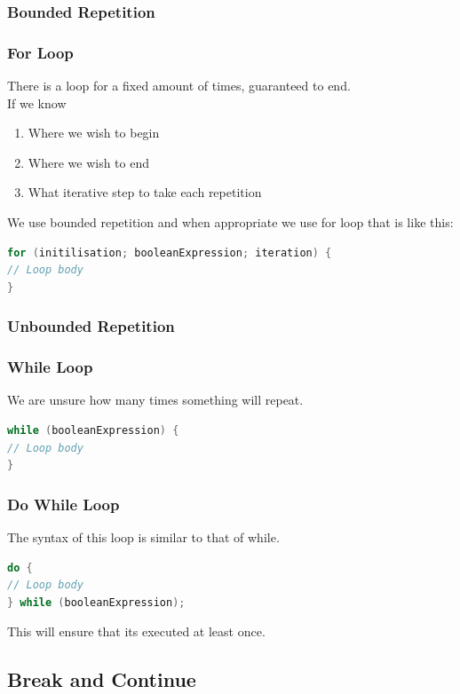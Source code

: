 \documentclass[11pt,a4 paper]{book}
\theoremstyle{plain}
\theoremstyle{definition}
\theoremstyle{remark}
\begin{document}
\begin{flushleft}
\subsubsection{Bounded Repetition}
\subsubsection{For Loop}

There is a loop for a fixed amount of times, guaranteed to end.\\
If we know
\begin{enumerate}
	\item Where we wish to begin \\
	\item Where we wish to end \\
	\item What iterative step to take each repetition 
\end{enumerate}
We use bounded repetition and when appropriate we use for loop that is like this:
\begin{lstlisting}[language = Java]
for (initilisation; booleanExpression; iteration) {
// Loop body
}
\end{lstlisting}
	
\subsubsection{Unbounded Repetition}
\subsubsection{While Loop}

We are unsure how many times something will repeat.

\begin{lstlisting}[language = Java]
while (booleanExpression) {
// Loop body
}
\end{lstlisting}
\subsubsection{Do While Loop}
The syntax of this loop is similar to that of while.
\begin{lstlisting}[language = Java]
do {
// Loop body
} while (booleanExpression);
\end{lstlisting}
This will ensure that its executed at least once.
\subsection{Break and Continue}

\end{flushleft}
\end{document}
